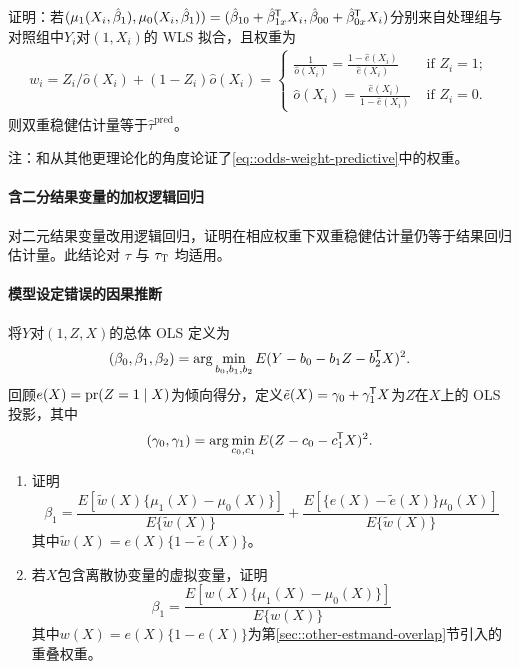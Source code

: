 证明：若$(\mu_1(X_i, \hat{\beta}_1), \mu_0(X_i, \hat{\beta}_1) ) =  
( \hat \beta_{10} +   \hat \beta_{1x}^{\mkern-1.5mu\mathsf{T}} X_i, \hat \beta_{00} +   \hat\beta_{0x}^{\mkern-1.5mu\mathsf{T}} X_i)$分别来自处理组与对照组中$Y_i$对$(1, X_i)$的 WLS 拟合，且权重为
\begin{eqnarray}
\label{eq::odds-weight-predictive}
w_i =  Z_i/\hat{o}(X_i) + (1-Z_i) \hat{o}(X_i)
= \begin{cases}
\frac{1}{\hat{o}(X_i)} = \frac{ 1-  \hat{e}(X_i) }{ \hat{e}(X_i) } & \text{ if } Z_i=1;\\
 \hat{o}(X_i) = \frac{  \hat{e}(X_i)  }{ 1-\hat{e}(X_i)} & \text{ if } Z_i=0.
\end{cases} 
\end{eqnarray}
则双重稳健估计量等于$\hat{\tau}^\text{pred} $。

注：\citet{cao2009improving}和\citet{vermeulen2015bias}从其他更理论化的角度论证了\eqref{eq::odds-weight-predictive}中的权重。 



\paragraph{含二分结果变量的加权逻辑回归}
\label{hw::wlogit-dr}
对二元结果变量改用逻辑回归，证明在相应权重下双重稳健估计量仍等于结果回归估计量。此结论对 $\tau$ 与 $\tau_\textsc{T}$ 均适用。 



\paragraph{模型设定错误的因果推断}




将$Y$对$ (1, Z, X) $的总体 OLS 定义为
$$
(\beta_0, \beta_1, \beta_2) = \arg\min_{b_0, b_1, b_2}   E(Y - b_0 - b_1 Z - b_2^{\mkern-1.5mu\mathsf{T}} X)^2. 
$$
回顾$e(X) = \textup{pr}(Z=1\mid X)$为倾向得分，定义$\tilde{e}(X) = \gamma_0+\gamma_1^{\mkern-1.5mu\mathsf{T}} X$为$Z$在$X$上的 OLS 投影，其中%
$$
(\gamma_0, \gamma_1) =  \arg\min_{c_0, c_1}   E(Z - c_0 -  c_1^{\mkern-1.5mu\mathsf{T}} X)^2. 
$$

\begin{enumerate}
\item
证明
$$
\beta_1 = \frac{    E [  \tilde{w}(X) \{ \mu_1(X) - \mu_0(X) \} ]  }{   E \{ \tilde{w}(X) \} }
+ \frac{  E [  \{  e(X) - \tilde{e}(X)  \}  \mu_0(X)  ] }{  E \{ \tilde{w}(X) \}  }
$$
其中$\tilde{w}(X) = e(X)\{ 1 - \tilde{e}(X)  \}$。 

\item
若$X$包含离散协变量的虚拟变量，证明
$$
\beta_1 = \frac{    E [  w(X) \{ \mu_1(X) - \mu_0(X) \} ]  }{   E \{ w(X) \} }
$$
其中$w(X) = e(X)\{ 1 - e(X)  \}$为第\ref{sec::other-estmand-overlap}节引入的重叠权重。 

\end{enumerate}


